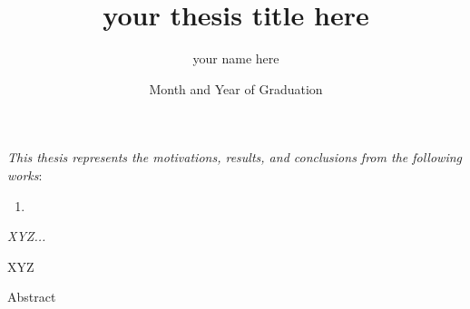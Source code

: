 \documentclass{ucetd}
\title{your thesis title here}
\author{your name here}
\date{Month and Year of Graduation}  %
\begin{document}
\maketitle

\makecopyright
\makededication

\tableofcontents
\cleardoublepage
{}
\listoffigures
\cleardoublepage
{}
\listoftables
\newpage

\begin{center}
    \textit{This thesis represents the motivations, results, and conclusions from the following works}:
    \\
    \begin{enumerate}

        \item[] 
    \end{enumerate}

\end{center}
\newpage
 
\acknowledgments
\begin{center}
    \textit{XYZ...}
\end{center}

XYZ

\abstract
Abstract


\mainmatter










\appendix







\end{document}
